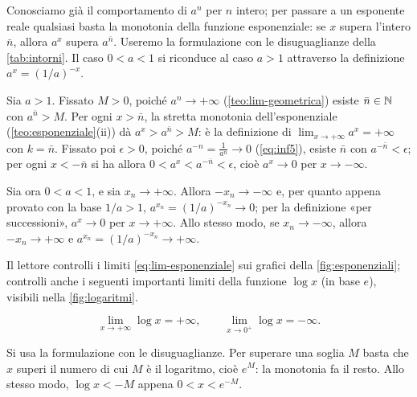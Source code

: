 \begin{strategia}
Conosciamo già il comportamento di $a^{n}$ per $n$ intero; per passare a un esponente
reale qualsiasi basta la monotonia della funzione esponenziale: se $x$ supera l'intero
$\bar n$, allora $a^{x}$ supera $a^{\bar n}$. Useremo la formulazione con le
disuguaglianze della \cref{tab:intorni}. Il caso $0<a<1$ si riconduce al caso $a>1$
attraverso la definizione $a^{x}=(1/a)^{-x}$.
\end{strategia}

\begin{dimostrazione}
Sia $a>1$. Fissato $M>0$, poiché $a^{n}\to+\infty$ (\cref{teo:lim-geometrica}) esiste
$\bar n\in\mathbb{N}$ con $a^{\bar n}>M$. Per ogni $x>\bar n$, la stretta monotonia
dell'esponenziale (\cref{teo:esponenziale}(ii)) dà $a^{x}>a^{\bar n}>M$: è la
definizione di $\lim_{x\to+\infty}a^{x}=+\infty$ con $k=\bar n$. Fissato poi $\epsilon>0$,
poiché $a^{-n}=\frac1{a^{n}}\to0$ (\eqref{eq:inf5}), esiste $\bar n$ con
$a^{-\bar n}<\epsilon$; per ogni $x<-\bar n$ si ha allora $0<a^{x}<a^{-\bar n}<\epsilon$,
cioè $a^{x}\to0$ per $x\to-\infty$.

Sia ora $0<a<1$, e sia $x_{n}\to+\infty$. Allora $-x_{n}\to-\infty$ e, per quanto appena
provato con la base $1/a>1$, $a^{x_{n}}=(1/a)^{-x_{n}}\to0$; per la definizione «per
successioni», $a^{x}\to0$ per $x\to+\infty$. Allo stesso modo, se $x_{n}\to-\infty$,
allora $-x_{n}\to+\infty$ e $a^{x_{n}}=(1/a)^{-x_{n}}\to+\infty$.
\end{dimostrazione}

Il lettore controlli i limiti \eqref{eq:lim-esponenziale} sui grafici della
\cref{fig:esponenziali}; controlli anche i seguenti importanti limiti della funzione
$\log x$ (in base $e$), visibili nella \cref{fig:logaritmi}.

\begin{proposizione}\label{prop:lim-logaritmo}
\begin{equation}\label{eq:lim-log}
  \lim_{x\to+\infty}\log x=+\infty, \qquad \lim_{x\to0^{+}}\log x=-\infty .
\end{equation}
\end{proposizione}

\begin{schema}
\end{schema}

\begin{strategia}
Si usa la formulazione con le disuguaglianze. Per superare una soglia $M$ basta che
$x$ superi il numero di cui $M$ è il logaritmo, cioè $e^{M}$: la monotonia fa il resto.
Allo stesso modo, $\log x<-M$ appena $0<x<e^{-M}$.
\end{strategia}


